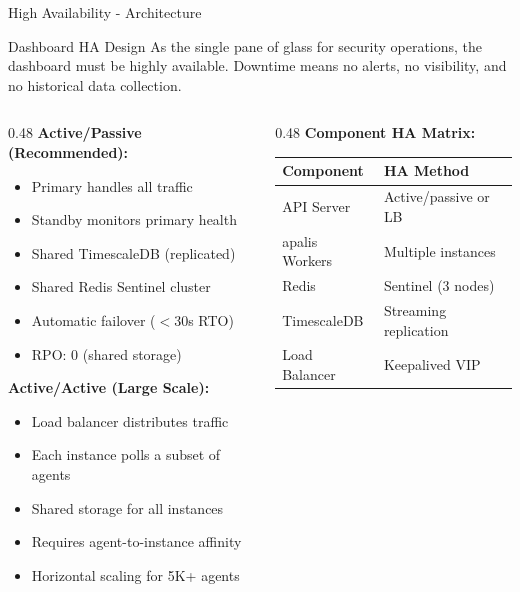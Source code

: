 \begin{frame}{High Availability - Architecture}
  \begin{block}{Dashboard HA Design}
    \scriptsize
    As the single pane of glass for security operations, the dashboard must be
    highly available. Downtime means no alerts, no visibility, and no historical data collection.
  \end{block}

  \vspace{0.1cm}

  \scriptsize
  \begin{columns}[T]
    \begin{column}{0.48\textwidth}
      \textbf{Active/Passive (Recommended):}
      \begin{itemize}
        \item Primary handles all traffic
        \item Standby monitors primary health
        \item Shared TimescaleDB (replicated)
        \item Shared Redis Sentinel cluster
        \item Automatic failover ($<$30s RTO)
        \item RPO: 0 (shared storage)
      \end{itemize}

      \vspace{0.1cm}

      \textbf{Active/Active (Large Scale):}
      \begin{itemize}
        \item Load balancer distributes traffic
        \item Each instance polls a subset of agents
        \item Shared storage for all instances
        \item Requires agent-to-instance affinity
        \item Horizontal scaling for 5K+ agents
      \end{itemize}
    \end{column}
    \begin{column}{0.48\textwidth}
      \textbf{Component HA Matrix:}
      \begin{center}
        \tiny
        \begin{tabular}{|l|l|}
          \hline
          \textbf{Component} & \textbf{HA Method} \\
          \hline
          API Server & Active/passive or LB \\
          \hline
          apalis Workers & Multiple instances \\
          \hline
          Redis & Sentinel (3 nodes) \\
          \hline
          TimescaleDB & Streaming replication \\
          \hline
          Load Balancer & Keepalived VIP \\
          \hline
        \end{tabular}
      \end{center}


\end{column}
\end{columns}
\end{frame}

